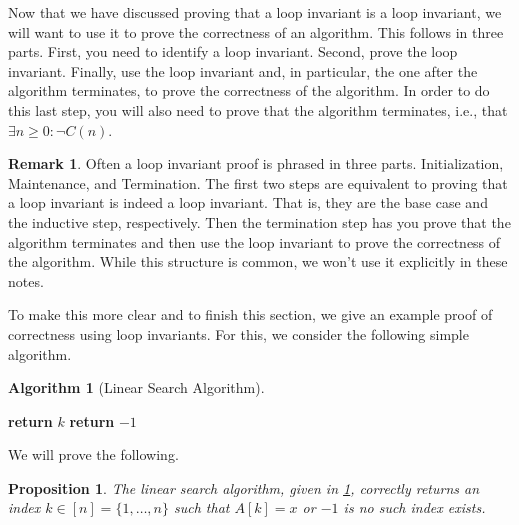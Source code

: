 \documentclass{article}
\theoremstyle{plain}
\newtheorem{proposition}{Proposition}
\theoremstyle{definition}
\newtheorem{remark}{Remark}
\newtheorem{algorithm}{Algorithm}
\begin{document}
Now that we have discussed proving that a loop invariant is a loop invariant, we will want to use it to prove the correctness of an algorithm. This follows in three parts. First, you need to identify a loop invariant. Second, prove the loop invariant. Finally, use the loop invariant and, in particular, the one after the algorithm terminates, to prove the correctness of the algorithm. In order to do this last step, you will also need to prove that the algorithm terminates, i.e., that \(\exists n \geq 0 : \lnot C(n)\).

\begin{remark}
    Often a loop invariant proof is phrased in three parts. Initialization, Maintenance, and Termination. The first two steps are equivalent to proving that a loop invariant is indeed a loop invariant. That is, they are the base case and the inductive step, respectively. Then the termination step has you prove that the algorithm terminates and then use the loop invariant to prove the correctness of the algorithm. While this structure is common, we won't use it explicitly in these notes.
\end{remark}

To make this more clear and to finish this section, we give an example proof of correctness using loop invariants. For this, we consider the following simple algorithm.

\begin{algorithm}[Linear Search Algorithm] \phantom{}\label{alg_lsearch}
\begin{center}
\begin{minipage}{.5\linewidth}
\begin{algorithmic}[1]
                \State \textbf{return} \(k\)
            \EndIf
        \EndFor
        \State \textbf{return} \(-1\)
    \EndProcedure
\end{algorithmic}
\end{minipage}
\end{center}
\end{algorithm}

We will prove the following.

\begin{proposition}\label{prop_correct_lsearch}
    The linear search algorithm, given in \cref{alg_lsearch}, correctly returns an index \(k \in [n] = \{1,\dotsc,n\}\) such that \(A[k] = x\) or \(-1\) is no such index exists. 
\end{proposition}
\end{document}
